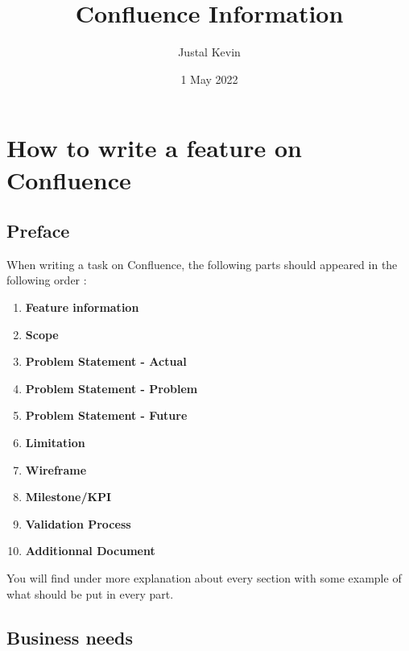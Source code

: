 \documentclass[a4paper,article,oneside]{memoir}
\title{\textbf{Confluence Information}}
\author{Justal Kevin}
\date{1 May 2022}
\begin{document}
\maketitle
\thispagestyle{empty}
\tableofcontents
\part{How to write a feature on Confluence}
	\chapter*{Preface}
		When writing a task on Confluence, the following parts should appeared in the following order :
	
        \begin{enumerate}
  			\item {\color{BrickRed}\textbf{Feature information}}
  			\item {\color{BrickRed}\textbf{Scope}}
  			\item {\color{BrickRed}\textbf{Problem Statement - Actual}}	\item {\color{BrickRed}\textbf{Problem Statement - Problem}}	\item {\color{BrickRed}\textbf{Problem Statement - Future}}
  			\item {\color{BrickRed}\textbf{Limitation}}
  			\item {\color{BrickRed}\textbf{Wireframe}}
  			\item {\color{BrickRed}\textbf{Milestone/KPI}}
  			\item {\color{BrickRed}\textbf{Validation Process}}
  			\item {\color{BrickRed}\textbf{Additionnal Document}}
		\end{enumerate}
		
	You will find under more explanation about every section with some example of what should be put in every part.
    \chapter{Business needs}
\end{document}
